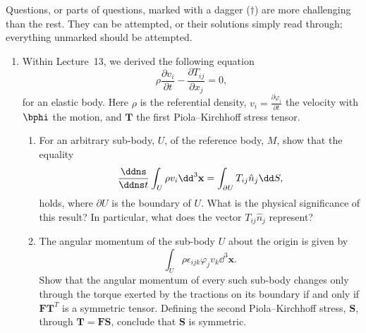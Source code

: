 \providecommand{\hardq}{\refstepcounter{enumi}\item[\labelenumi$^{\dagger}$]}
\providecommand{\hardp}{\refstepcounter{enumii}\item[\labelenumii$^{\dagger}$]}
\noindent Questions, or parts of questions, marked with a dagger ($\dagger$) are more challenging than the rest. They can be attempted, or their solutions simply read through; everything unmarked should be attempted.

\begin{enumerate}

\item Within Lecture~13, we derived the following equation
\begin{equation*}
    \rho\frac{\partial v_{i}}{\partial t}-\frac{\partial T_{ij}}{\partial x_{j}}=0,
\end{equation*}
for an elastic body. Here $\rho$ is the referential density, $v_{i} = \frac{\partial \varphi_{i}}{\partial t}$ the velocity with $\bphi$ the motion, and $\mathbf{T}$ the first Piola--Kirchhoff stress tensor.

\begin{enumerate}
     \item 
     For an arbitrary sub-body, $U$, of the reference body, $M$, show that the equality
    \begin{equation*}
        \frac{\ddns}{\ddns t}\int_{U}\rho v_{i}\dd^{3}\mathbf{x}=\int_{\partial U}T_{ij}\hat{n}_{j}\dd S,
    \end{equation*}
    holds, where $\partial U$ is the boundary of $U$. What is the physical significance of this result? In particular, what does the vector $T_{ij}\hat{n}_{j}$ represent?


    \item
    The angular momentum of the sub-body $U$ about the origin is given by
    \begin{equation*}
        \int_{U}\rho\epsilon_{ijk}\varphi_{j}v_{k}\dd^{3}\mathbf{x}.
    \end{equation*}
    Show that the angular momentum of every such sub-body changes only through the torque exerted by the tractions on its boundary if and only if $\mathbf{F}\mathbf{T}^{T}$ is a symmetric tensor. Defining the second Piola--Kirchhoff stress, $\mathbf{S}$, through $\mathbf{T}=\mathbf{F}\mathbf{S}$, conclude that $\mathbf{S}$ is symmetric.

   
    

\end{enumerate}


\end{enumerate}
